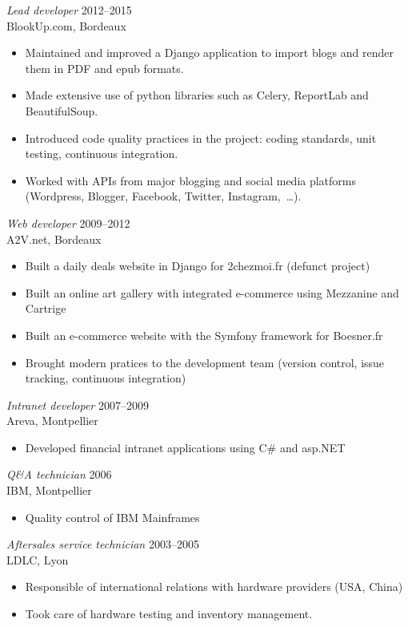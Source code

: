\documentclass[margin]{res}
\begin{document}
\begin{resume}
{\sl Lead developer\/} \hfill 2012--2015\\
BlookUp.com, Bordeaux
\begin{itemize} \itemsep -2pt
    \item Maintained and improved a Django application to import blogs and render them in PDF and epub formats.
    \item Made extensive use of python libraries such as Celery, ReportLab and BeautifulSoup.
    \item Introduced code quality practices in the project: coding standards, unit testing, continuous integration.
    \item Worked with APIs from major blogging and social media platforms (Wordpress, Blogger, Facebook, Twitter, Instagram, …).
\end{itemize}

{\sl Web developer\/} \hfill 2009--2012 \\
A2V.net, Bordeaux
\begin{itemize}  \itemsep -2pt
    \item Built a daily deals website in Django for 2chezmoi.fr  (defunct project)
    \item Built an online art gallery with integrated e-commerce using Mezzanine and Cartrige
    \item Built an e-commerce website with the Symfony framework for Boesner.fr
    \item Brought modern pratices to the development team (version control, issue tracking, continuous integration)
\end{itemize}

{\sl Intranet developer\/} \hfill 2007--2009 \\
Areva, Montpellier
\begin{itemize} \itemsep -2pt
    \item Developed financial intranet applications using C\# and asp.NET
\end{itemize}

{\sl Q\&A technician\/} \hfill 2006 \\
IBM, Montpellier
\begin{itemize}  \itemsep -2pt
    \item Quality control of IBM Mainframes
\end{itemize}

{\sl Aftersales service technician\/} \hfill     2003--2005 \\
LDLC, Lyon
\begin{itemize}  \itemsep -2pt
    \item Responsible of international relations with hardware providers (USA, China)
    \item Took care of hardware testing and inventory management.
\end{itemize}


\end{resume}
\end{document}

